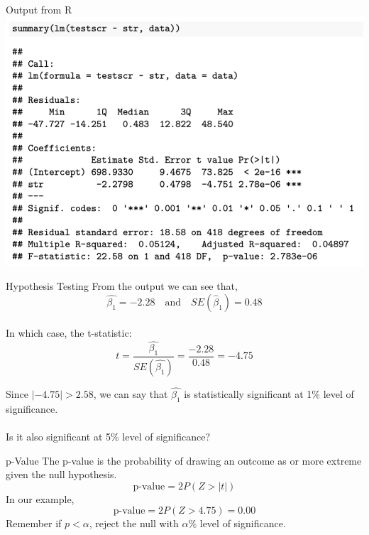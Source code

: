 \documentclass{./../div_teaching_slides}
\begin{document}
\begin{frame}{Output from R}
\vspace{-0.5em}
\centering
\includegraphics[scale=0.4]{reg_output.png}
\end{frame}

\begin{frame}{Hypothesis Testing}
From the output we can see that,
$$ \hat{\beta_1}=-2.28  \quad \text{and} \quad SE(\hat{\beta}_1)=0.48   $$ \\
In which case, the t-statistic:
$$ t = \frac{\hat{\beta_1}}{SE(\hat{\beta_1})} = \frac{-2.28}{0.48} = -4.75 $$
\vspace{0.5em}

Since $|-4.75|>2.58$, we can say that $\hat{\beta_1}$ is statistically significant at 1\% level of significance. \\~\\
\pause Is it also significant at 5\% level of significance?
\end{frame}

\begin{frame}{p-Value}
The p-value is the probability of drawing an outcome as or more extreme given the null hypothesis.
$$ \text{p-value} = 2 P(Z > |t|) $$
In our example, 
$$ \text{p-value} = 2 P(Z > 4.75) = 0.00 $$
Remember if $p<\alpha$, reject the null with $\alpha \%$ level of significance. 
\end{frame}
\end{document}
